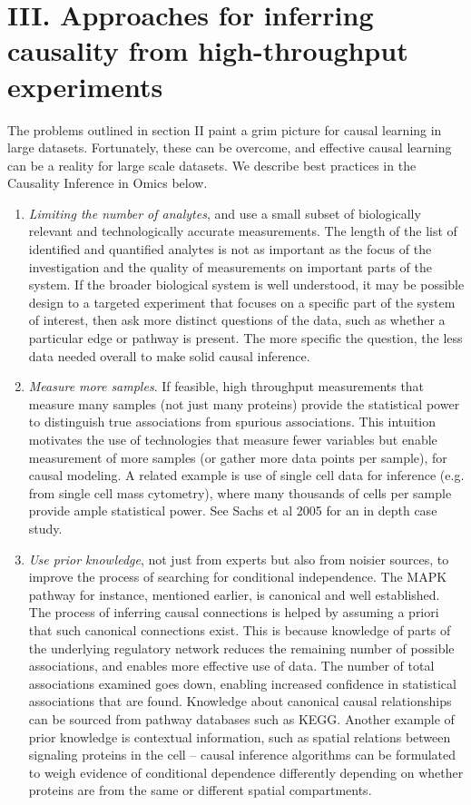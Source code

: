 \documentclass[journal=jacsat,manuscript=article]{achemso}
\begin{document}
\section{III. Approaches for inferring causality from high-throughput experiments}

The problems outlined in section II paint a grim picture for causal learning in large datasets. Fortunately, these can be overcome, and effective causal learning can be a reality for large scale datasets.  We describe best practices  in the Causality Inference in Omics  below.


\begin{enumerate}
\item \textit{Limiting the number of analytes}, and use a small subset of biologically relevant and technologically accurate measurements. The length of the list of identified and quantified analytes is not as important as the focus of the investigation and the quality of measurements on important parts of the system.  If the broader biological system is well understood, it may be possible design to a targeted experiment that focuses on a specific part of the system of interest, then ask more distinct questions of the data, such as whether a particular edge or pathway is present.  The more specific the question, the less data needed overall to make solid causal inference.  
\item \textit{Measure more samples}.  If feasible, high throughput measurements that measure many samples (not just many proteins) provide the statistical power to distinguish true associations from spurious associations.  This intuition motivates the use of technologies that measure fewer variables but enable measurement of more samples (or gather more data points per sample), for causal modeling.  A related  example is  use of single cell data for inference (e.g. from single cell  mass cytometry), where  many thousands of cells per sample provide ample statistical power. See Sachs et al 2005 for an in depth case study. \cite{sachs2005causal}
\item \textit{Use prior knowledge}, not just from experts but also from noisier sources, to improve the process of searching for conditional independence.  The MAPK pathway for instance, mentioned earlier, is canonical and well established.  The process of inferring causal connections is helped by assuming a priori that such canonical connections exist. This is because knowledge of parts of the underlying regulatory network reduces the remaining number of possible associations, and enables more effective use of data. The number of total associations examined goes down, enabling increased confidence in statistical associations that are found.  Knowledge about canonical causal relationships can be sourced from pathway databases such as KEGG. Another example of prior knowledge is contextual information, such as spatial relations between  signaling proteins in the cell -- causal inference algorithms can be formulated to weigh evidence of conditional dependence differently depending on whether proteins are from the same or different spatial compartments. 

\end{enumerate}
\end{document}
